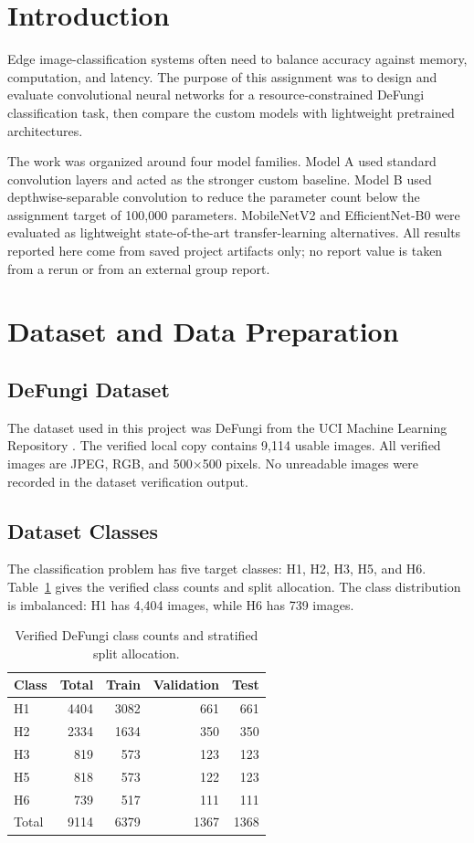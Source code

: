 \documentclass[11pt,a4paper]{article}
\begin{document}
\section{Introduction}
Edge image-classification systems often need to balance accuracy against memory, computation, and latency. The purpose of this assignment was to design and evaluate convolutional neural networks for a resource-constrained DeFungi classification task, then compare the custom models with lightweight pretrained architectures.

The work was organized around four model families. Model A used standard convolution layers and acted as the stronger custom baseline. Model B used depthwise-separable convolution to reduce the parameter count below the assignment target of 100,000 parameters. MobileNetV2 \cite{sandler2018mobilenetv2} and EfficientNet-B0 \cite{tan2019efficientnet} were evaluated as lightweight state-of-the-art transfer-learning alternatives. All results reported here come from saved project artifacts only; no report value is taken from a rerun or from an external group report.

\section{Dataset and Data Preparation}
\subsection{DeFungi Dataset}
The dataset used in this project was DeFungi from the UCI Machine Learning Repository \cite{uci_defungi}. The verified local copy contains 9,114 usable images. All verified images are JPEG, RGB, and 500$\times$500 pixels. No unreadable images were recorded in the dataset verification output.

\subsection{Dataset Classes}
The classification problem has five target classes: H1, H2, H3, H5, and H6. Table~\ref{tab:dataset_split} gives the verified class counts and split allocation. The class distribution is imbalanced: H1 has 4,404 images, while H6 has 739 images.

\begin{table}[H]
\centering
\caption{Verified DeFungi class counts and stratified split allocation.}
\label{tab:dataset_split}
\begin{tabular}{lrrrr}
\toprule
Class & Total & Train & Validation & Test \\
\midrule
H1 & 4404 & 3082 & 661 & 661 \\
H2 & 2334 & 1634 & 350 & 350 \\
H3 & 819 & 573 & 123 & 123 \\
H5 & 818 & 573 & 122 & 123 \\
H6 & 739 & 517 & 111 & 111 \\
\midrule
Total & 9114 & 6379 & 1367 & 1368 \\
\bottomrule
\end{tabular}
\end{table}
\end{document}
